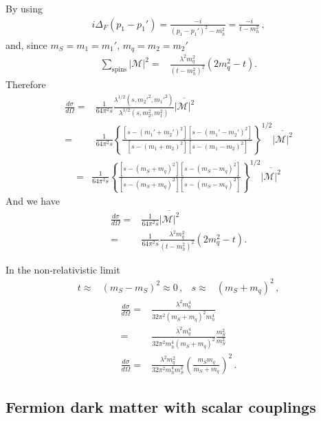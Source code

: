 By using
\begin{align}
  i\Delta_F( p_1-p_1')=\frac{-i}{(p_1-p_1')^2-m_h^2}
  =\frac{-i}{t-m_h^2}\,,
\end{align}
and, since $m_S=m_1=m_1'$, $m_q=m_2=m_2'$
\begin{align}
   \sum_{\text{spins}} |\mathcal{M}|^2=&\frac{\lambda^2 m_q^2}{\left( t-m_h^2 \right)^2} \left(2m_q^2-t\right).
\end{align}
Therefore
\begin{align}
     \frac{d\sigma}{d\Omega}=&\frac{1}{64\pi^2s}
\frac{\lambda^{1/2}(s,{m_2'}^2,{m_1'}^2)}{\lambda^{1/2}(s,m_2^2,m_1^2)}
                               \overline{|\mathcal{M}|^2} \nonumber\\
=&\frac{1}{64\pi^2s}\left\{
\frac{[s-(m_1'+m_2')^2][s-(m_1'-m_2')^2]}{[s-(m_1+m_2)^2][s-(m_1-m_2)^2]}\right\}^{1/2}
\overline{|\mathcal{M}|^2}  
\end{align}
\begin{align}
  =&\frac{1}{64\pi^2s}\left\{
\frac{[s-(m_S+m_q)^2][s-(m_S-m_q)^2]}{[s-(m_S+m_q)^2][s-(m_S-m_q)^2]}\right\}^{1/2}
\overline{|\mathcal{M}|^2}  
\end{align}
And we have 
\begin{align}
\frac{d\sigma}{d\Omega}  =&\frac{1}{64\pi^2s}\overline{|\mathcal{M}|^2} \nonumber\\
  =&\frac{1}{64\pi^2s}\frac{\lambda^2 m_q^2}{\left( t-m_h^2 \right)^2}
     \left(2m_q^2-t\right).
\end{align}

In the non-relativistic limit
\begin{align}
  t\approx& (m_S-m_S)^2\approx 0\,,& 
  s\approx& (m_S+m_q)^2\,,
\end{align}
\begin{align}
   \frac{d\sigma}{d\Omega}=& \frac{\lambda^2 m_q^4}{32\pi^2 \left(m_S+m_q\right)^2m_h^4}\nonumber\\
  =&
     \frac{\lambda^2 m_q^4}{32\pi^2 m_h^4\left(m_S+m_q\right)^2}
     \frac{m_S^2}{m_S^2}\nonumber\\
       \frac{d\sigma}{d\Omega}
                    =&\frac{\lambda^2m_q^2}{32\pi^2m_h^4m_S^2}\left( \frac{m_Sm_q}{m_S+m_q} \right)^2\,.
\end{align}


\subsection{Fermion dark matter with scalar couplings}

